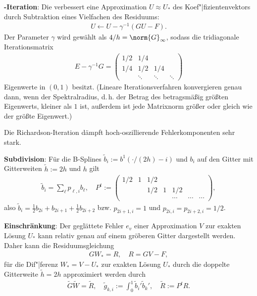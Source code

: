 \textbf{-Iteration}:
Die  verbessert eine Approximation $U \approx U_\ast$
des Koef"|fizientenvektors durch Subtraktion eines Vielfachen des Residuums:
\begin{align*}
    U \leftarrow U - \gamma^{-1} (GU - F).
\end{align*}
Der Parameter $\gamma$ wird gewählt als $4/h = \norm{G}_\infty$,
sodass die tridiagonale Iterationsmatrix
\begin{align*}
    E - \gamma^{-1} G =
    \begin{pmatrix}1/2 & 1/4 & &\\1/4 & 1/2 & 1/4 & \\ & \ddots & \ddots & \ddots\end{pmatrix}
\end{align*}
Eigenwerte in $(0, 1)$ besitzt.
(Lineare Iterationsverfahren konvergieren genau dann, wenn der Spektralradius,
d.\,h. der Betrag des betragsmäßig größten Eigenwerts, kleiner als $1$ ist,
außerdem ist jede Matrixnorm größer oder gleich wie der größte Eigenwert.)

Die Richardson-Iteration dämpft hoch-oszillierende Fehlerkomponenten sehr stark.

\linie
\pagebreak

\textbf{Subdivision}:
Für die B-Splines $\widetilde{b}_i := b^1(\cdot/(2h) - i)$ und $b_i$ auf den Gitter mit
Gitterweiten $\widetilde{h} := 2h$ und $h$ gilt
\begin{align*}
    \widetilde{b}_i = \sum_\ell p_{\ell,i} b_\ell,\quad
    P^t := \begin{pmatrix}1/2 & 1 & 1/2 & & & &\\&&1/2 & 1 & 1/2 & &\\&&&&
    \dotsb&\dotsb&\dotsb\end{pmatrix},
\end{align*}
also $\widetilde{b}_i = \frac{1}{2} b_{2i} + b_{2i+1} + \frac{1}{2} b_{2i+2}$ bzw.
$p_{2i+1,i} = 1$ und $p_{2i,i} = p_{2i+2,i} = 1/2$.

\linie

\textbf{Einschränkung}:
Der geglättete Fehler $e_v$ einer Approximation $V$ zur exakten Lösung $U_\ast$
kann relativ genau auf einem gröberen Gitter dargestellt werden.
Daher kann die Residuumsgleichung
\begin{align*}
    GW_\ast = R,\quad
    R = GV - F,
\end{align*}
für die Dif"|ferenz $W_\ast = V - U_\ast$ zur exakten Lösung $U_\ast$ durch die doppelte
Gitterweite $\widetilde{h} = 2h$ approximiert werden durch
\begin{align*}
    \widetilde{G} \widetilde{W} = \widetilde{R},\quad
    \widetilde{g}_{k,i} := \int_0^1 \widetilde{b}_i' \widetilde{b}_k',\quad
    \widetilde{R} := P^t R.
\end{align*}

